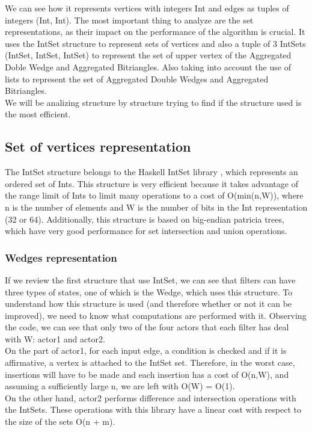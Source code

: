 We can see how it represents vertices with integers Int and edges as tuples of integers (Int, Int).
The most important thing to analyze are the set representations, as their impact on the performance of the algorithm is crucial.
It uses the IntSet structure to represent sets of vertices and also a tuple of 3 IntSets (IntSet, IntSet, IntSet) to represent the set of upper vertex of the Aggregated Doble Wedge and Aggregated Bitriangles. \cite[][Page52]{royo_sales_algorithm_2021}
Also taking into account the use of lists to represent the set of Aggregated Double Wedges and Aggregated Bitriangles. \\

We will be analizing structure by structure trying to find if the structure used is the most efficient.
\subsection{Set of vertices representation}
The IntSet structure belongs to the Haskell IntSet library \cite{noauthor_dataintset_nodate}, which represents an ordered set of Ints.
This structure is very efficient because it takes advantage of the range limit of Ints to limit many operations to a cost of O(min(n,W)), where n is the number of elements and W is the number of bits in the Int representation (32 or 64).
Additionally, this structure is based on big-endian patricia trees, which have very good performance for set intersection and union operations.

\subsubsection*{Wedges representation}
If we review the first structure that use IntSet, we can see that filters can have three types of states, one of which is the Wedge, which uses this structure.
To understand how this structure is used (and therefore whether or not it can be improved), we need to know what computations are performed with it.
Observing the code, we can see that only two of the four actors that each filter has deal with W: actor1 and actor2.\\
On the part of actor1, for each input edge, a condition is checked and if it is affirmative, a vertex is attached to the IntSet set.
Therefore, in the worst case, insertions will have to be made and each insertion has a cost of O(n,W), and assuming a sufficiently large n, we are left with O(W) = O(1). \\
On the other hand, actor2 performs difference and intersection operations with the IntSets.
These operations with this library have a linear cost with respect to the size of the sets O(n + m). \\

